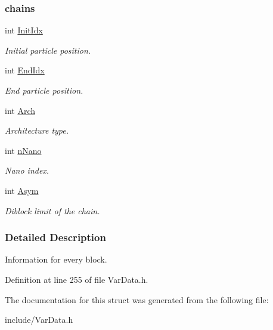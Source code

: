 \begin{DoxyCompactItemize}
\begin{DoxyCompactList}\small\item\em \subsubsection*{chains}\end{DoxyCompactList}\item 
int \hyperlink{structBLOCK_a71d10413e52e4e5aa82ac5e6189afdd0}{Init\+Idx}\hypertarget{structBLOCK_a71d10413e52e4e5aa82ac5e6189afdd0}{}\label{structBLOCK_a71d10413e52e4e5aa82ac5e6189afdd0}

\begin{DoxyCompactList}\small\item\em Initial particle position. \end{DoxyCompactList}\item 
int \hyperlink{structBLOCK_a3fa6306dcea956ea84ce7b5f2b22f628}{End\+Idx}\hypertarget{structBLOCK_a3fa6306dcea956ea84ce7b5f2b22f628}{}\label{structBLOCK_a3fa6306dcea956ea84ce7b5f2b22f628}

\begin{DoxyCompactList}\small\item\em End particle position. \end{DoxyCompactList}\item 
int \hyperlink{structBLOCK_ab953dc37c933d1b21ba1d94b87c65bca}{Arch}\hypertarget{structBLOCK_ab953dc37c933d1b21ba1d94b87c65bca}{}\label{structBLOCK_ab953dc37c933d1b21ba1d94b87c65bca}

\begin{DoxyCompactList}\small\item\em Architecture type. \end{DoxyCompactList}\item 
int \hyperlink{structBLOCK_ad984dd2cb572ac6c2deac801d0c2f947}{n\+Nano}\hypertarget{structBLOCK_ad984dd2cb572ac6c2deac801d0c2f947}{}\label{structBLOCK_ad984dd2cb572ac6c2deac801d0c2f947}

\begin{DoxyCompactList}\small\item\em Nano index. \end{DoxyCompactList}\item 
int \hyperlink{structBLOCK_af914cf19bda574d081fa0a7b243bf7dc}{Asym}\hypertarget{structBLOCK_af914cf19bda574d081fa0a7b243bf7dc}{}\label{structBLOCK_af914cf19bda574d081fa0a7b243bf7dc}

\begin{DoxyCompactList}\small\item\em Diblock limit of the chain. \end{DoxyCompactList}\end{DoxyCompactItemize}


\subsubsection{Detailed Description}
Information for every block. 

Definition at line 255 of file Var\+Data.\+h.



The documentation for this struct was generated from the following file\+:\begin{DoxyCompactItemize}
\item 
include/Var\+Data.\+h\end{DoxyCompactItemize}
